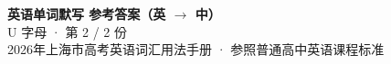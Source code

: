 \documentclass[10pt,a4paper]{article}
\begin{document}
\pagestyle{plain}

\begin{center}
{\LARGE\bfseries 英语单词默写 \quad 参考答案（英 $\to$ 中）}\\[0.22em]
{\large U 字母 · 第 2 / 2 份}\\[0.18em]
{\small 2026年上海市高考英语词汇用法手册 · 参照普通高中英语课程标准}
\end{center}

\vspace{0.2em}
\noindent{\color{rulegray}\rule{\textwidth}{0.8pt}}

\vspace{0.35em}

\vspace{0.25em}
\renewcommand{\arraystretch}{1.32}
\end{document}
